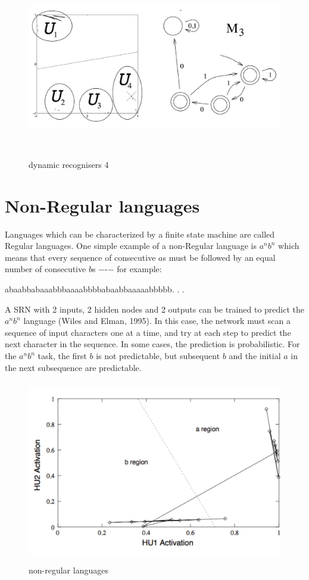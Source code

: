 \documentclass[11pt]{article}
\begin{document}
\begin{figure}[h]
    \centering
    \includegraphics[width=12cm, height=8cm]{../out/images/dynamic-recognisers-4}
    \caption[dynamic recognisers 4]{dynamic recognisers 4}
    \label{fig: dynamic recognisers 4}
\end{figure}


\section{Non-Regular languages}\label{sec:non-regular-languages}
Languages which can be characterized by a finite state machine are called
Regular languages.
One simple example of a non-Regular language is $a^n b^n$ which means that
every sequence of consecutive $a$s must be followed by an equal number of
consecutive $b$s −-− for example:

abaabbabaaabbbaaaabbbbabaabbaaaaabbbbb. . .

A SRN with 2 inputs, 2 hidden nodes and 2 outputs can be trained to predict the
$a^n b^n$ language (Wiles and Elman, 1995).
In this case, the network must scan a sequence of input characters one at a
time, and try at each step to predict the next character in the sequence.
In some cases, the prediction is probabilistic.
For the $a^n b^n$ task, the first $b$ is not predictable, but subsequent $b$
and the initial $a$ in the next subsequence are predictable.

    \begin{figure}[h]
    \centering
    \includegraphics[width=12cm, height=8cm]{../out/images/non-regular-languages}
    \caption[non-regular languages]{non-regular languages}
    \label{fig: non-regular languages}
    \end{figure}
\end{document}
